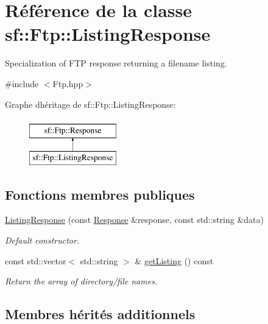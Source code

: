 \hypertarget{classsf_1_1Ftp_1_1ListingResponse}{}\section{Référence de la classe sf\+:\+:Ftp\+:\+:Listing\+Response}
\label{classsf_1_1Ftp_1_1ListingResponse}


Specialization of F\+TP response returning a filename listing.  




{\ttfamily \#include $<$Ftp.\+hpp$>$}

Graphe d\textquotesingle{}héritage de sf\+:\+:Ftp\+:\+:Listing\+Response\+:\begin{figure}[H]
\begin{center}
\leavevmode
\includegraphics[height=2.000000cm]{classsf_1_1Ftp_1_1ListingResponse}
\end{center}
\end{figure}
\subsection*{Fonctions membres publiques}
\begin{DoxyCompactItemize}
\item 
\hyperlink{classsf_1_1Ftp_1_1ListingResponse_a7e98d0aed70105c71adb52e5b6ce0bb8}{Listing\+Response} (const \hyperlink{classsf_1_1Ftp_1_1Response}{Response} \&response, const std\+::string \&data)
\begin{DoxyCompactList}\small\item\em Default constructor. \end{DoxyCompactList}\item 
const std\+::vector$<$ std\+::string $>$ \& \hyperlink{classsf_1_1Ftp_1_1ListingResponse_a6cdcdfcc6a9008c7e1eddb48b164793d}{get\+Listing} () const
\begin{DoxyCompactList}\small\item\em Return the array of directory/file names. \end{DoxyCompactList}\end{DoxyCompactItemize}
\subsection*{Membres hérités additionnels}


